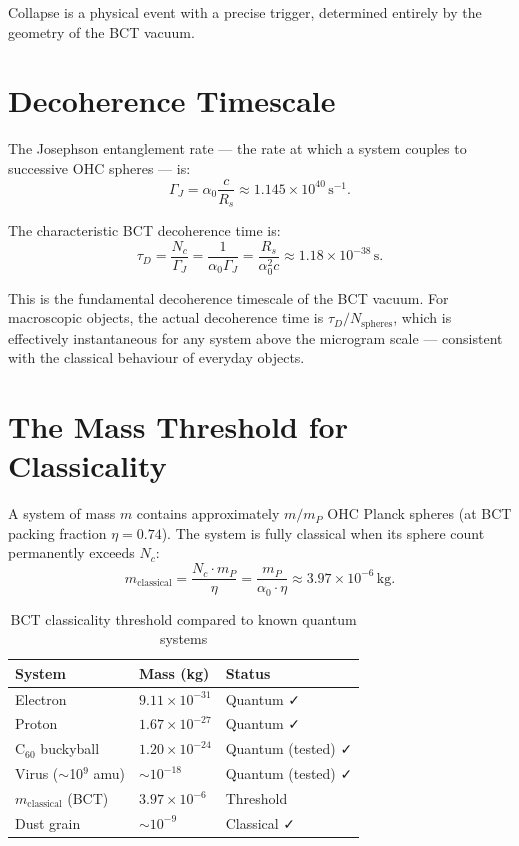 \documentclass[aps,prl,twocolumn,superscriptaddress,showpacs]{revtex4-2}
\begin{document}
Collapse is a physical event with a precise trigger, determined entirely 
by the geometry of the BCT vacuum.

\section{Decoherence Timescale}

The Josephson entanglement rate --- the rate at which a system couples 
to successive OHC spheres --- is:
\begin{equation}
\Gamma_J = \alpha_0 \frac{c}{R_s} \approx 1.145\times 10^{40}\,\mathrm{s}^{-1}.
\end{equation}

The characteristic BCT decoherence time is:
\begin{equation}
\tau_D = \frac{N_c}{\Gamma_J} = \frac{1}{\alpha_0 \Gamma_J} 
= \frac{R_s}{\alpha_0^2 c} \approx 1.18\times 10^{-38}\,\mathrm{s}.
\end{equation}

This is the fundamental decoherence timescale of the BCT vacuum. For 
macroscopic objects, the actual decoherence time is $\tau_D/N_\mathrm{spheres}$, 
which is effectively instantaneous for any system above the microgram scale 
--- consistent with the classical behaviour of everyday objects.

\section{The Mass Threshold for Classicality}

A system of mass $m$ contains approximately $m/m_P$ OHC Planck spheres 
(at BCT packing fraction $\eta = 0.74$). The system is fully classical 
when its sphere count permanently exceeds $N_c$:
\begin{equation}
m_\mathrm{classical} = \frac{N_c \cdot m_P}{\eta} 
= \frac{m_P}{\alpha_0 \cdot \eta} \approx 3.97\times 10^{-6}\,\mathrm{kg}.
\end{equation}

\begin{table}[h]
\centering
\caption{BCT classicality threshold compared to known quantum systems}
\begin{tabular}{lll}
\hline\hline
System & Mass (kg) & Status \\
\hline
Electron & $9.11\times 10^{-31}$ & Quantum ✓ \\
Proton & $1.67\times 10^{-27}$ & Quantum ✓ \\
C$_{60}$ buckyball & $1.20\times 10^{-24}$ & Quantum (tested) ✓ \\
Virus ($\sim$10$^9$ amu) & $\sim 10^{-18}$ & Quantum (tested) ✓ \\
$m_\mathrm{classical}$ (BCT) & $3.97\times 10^{-6}$ & Threshold \\
Dust grain & $\sim 10^{-9}$ & Classical ✓ \\
\hline\hline
\end{tabular}
\end{table}
\end{document}
